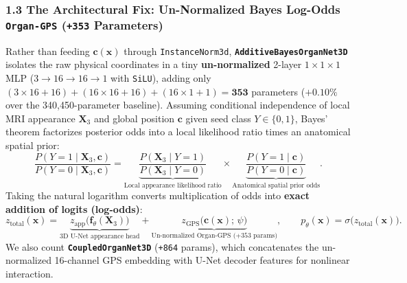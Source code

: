 \documentclass[10pt,a4paper]{article}
\renewcommand{\_}{\origunderscore\allowbreak}
\begin{document}
\subsubsection*{1.3 The Architectural Fix: Un-Normalized Bayes Log-Odds \texttt{Organ-GPS} (\texttt{+353} Parameters)}
Rather than feeding $\mathbf{c}(\mathbf{x})$ through \texttt{InstanceNorm3d}, \textbf{\texttt{AdditiveBayesOrganNet3D}} isolates the raw physical coordinates in a tiny \textbf{un-normalized} 2-layer $1 \times 1 \times 1$ MLP ($3 \to 16 \to 16 \to 1$ with \texttt{SiLU}), adding only $(3{\times}16 + 16) + (16{\times}16 + 16) + (16{\times}1 + 1) = \mathbf{353}$ parameters ($+0.10\%$ over the 340,450-parameter baseline). Assuming conditional independence of local MRI appearance $\mathbf{X}_3$ and global position $\mathbf{c}$ given seed class $Y \in \{0, 1\}$, Bayes' theorem factorizes posterior odds into a local likelihood ratio times an anatomical spatial prior:
\[
\frac{P(Y = 1 \mid \mathbf{X}_3, \mathbf{c})}{P(Y = 0 \mid \mathbf{X}_3, \mathbf{c})} = \underbrace{\frac{P(\mathbf{X}_3 \mid Y = 1)}{P(\mathbf{X}_3 \mid Y = 0)}}_{\text{Local appearance likelihood ratio}} \times \underbrace{\frac{P(Y = 1 \mid \mathbf{c})}{P(Y = 0 \mid \mathbf{c})}}_{\text{Anatomical spatial prior odds}}.
\]
Taking the natural logarithm converts multiplication of odds into \textbf{exact addition of logits (log-odds)}:
\[
z_{\text{total}}(\mathbf{x}) = \underbrace{z_{\text{app}}\bigl(\mathbf{f}_\theta(\mathbf{X}_3)\bigr)}_{\text{3D U-Net appearance head}} + \underbrace{z_{\text{GPS}}\bigl(\mathbf{c}(\mathbf{x});\, \psi\bigr)}_{\text{Un-normalized Organ-GPS (+353 params)}}, \qquad p_\theta(\mathbf{x}) = \sigma\bigl(z_{\text{total}}(\mathbf{x})\bigr).
\]
We also count \textbf{\texttt{CoupledOrganNet3D}} (\texttt{+864} params), which concatenates the un-normalized 16-channel GPS embedding with U-Net decoder features for nonlinear interaction.
\end{document}
